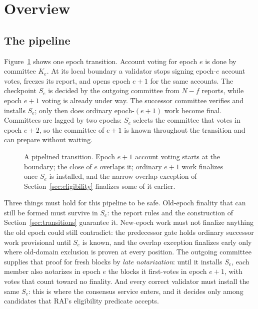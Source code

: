 \section{Overview}
\label{sec:overview}
\subsection{The pipeline}
Figure~\ref{fig:pipeline} shows one epoch transition. Account voting for epoch $e$ is done by committee $K_e$. At its local boundary a validator stops signing epoch-$e$ account votes, freezes its report, and opens epoch $e+1$ for the same accounts. The checkpoint $S_e$ is decided by the outgoing committee from $N-f$ reports, while epoch $e+1$ voting is already under way. The successor committee verifies and installs $S_e$; only then does ordinary epoch-$(e+1)$ work become final. Committees are lagged by two epochs: $S_e$ selects the committee that votes in epoch $e+2$, so the committee of $e+1$ is known throughout the transition and can prepare without waiting.

\begin{figure}[t]
\centering
{}
\caption{A pipelined transition. Epoch $e+1$ account voting starts at the boundary; the close of $e$ overlaps it; ordinary $e+1$ work finalizes once $S_e$ is installed, and the narrow overlap exception of Section~\ref{sec:eligibility} finalizes some of it earlier.}
\label{fig:pipeline}
\end{figure}

Three things must hold for this pipeline to be safe. Old-epoch finality that can still be formed must survive in $S_e$: the report rules and the construction of Section~\ref{sec:transitions} guarantee it. New-epoch work must not finalize anything the old epoch could still contradict: the predecessor gate holds ordinary successor work provisional until $S_e$ is known, and the overlap exception finalizes early only where old-domain exclusion is proven at every position. The outgoing committee supplies that proof for fresh blocks by \emph{late notarization}: until it installs $S_e$, each member also notarizes in epoch $e$ the blocks it first-votes in epoch $e+1$, with votes that count toward no finality. And every correct validator must install the same $S_e$: this is where the consensus service enters, and it decides only among candidates that RAI's eligibility predicate accepts.

